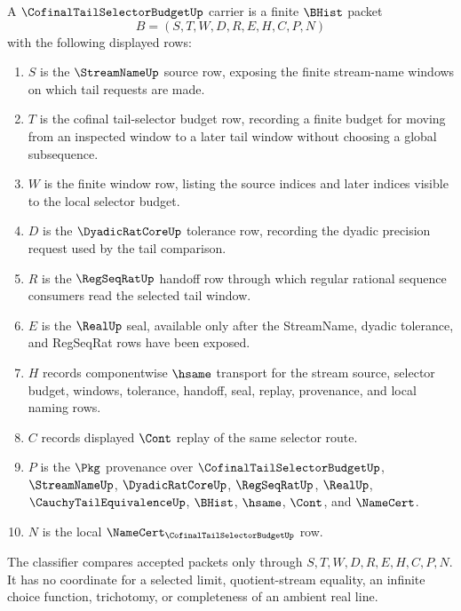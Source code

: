 \begin{definition}
\label{def:cofinal-tail-selector-budget-carrier}
A $\CofinalTailSelectorBudgetUp$ carrier is a finite $\BHist$ packet
$$
B=(S,T,W,D,R,E,H,C,P,N)
$$
with the following displayed rows:
\begin{enumerate}
\item $S$ is the $\StreamNameUp$ source row, exposing the finite stream-name windows on which tail requests are made.
\item $T$ is the cofinal tail-selector budget row, recording a finite budget for moving from an inspected window to a later tail window without choosing a global subsequence.
\item $W$ is the finite window row, listing the source indices and later indices visible to the local selector budget.
\item $D$ is the $\DyadicRatCoreUp$ tolerance row, recording the dyadic precision request used by the tail comparison.
\item $R$ is the $\RegSeqRatUp$ handoff row through which regular rational sequence consumers read the selected tail window.
\item $E$ is the $\RealUp$ seal, available only after the StreamName, dyadic tolerance, and RegSeqRat rows have been exposed.
\item $H$ records componentwise $\hsame$ transport for the stream source, selector budget, windows, tolerance, handoff, seal, replay, provenance, and local naming rows.
\item $C$ records displayed $\Cont$ replay of the same selector route.
\item $P$ is the $\Pkg$ provenance over $\CofinalTailSelectorBudgetUp$, $\StreamNameUp$, $\DyadicRatCoreUp$, $\RegSeqRatUp$, $\RealUp$, $\CauchyTailEquivalenceUp$, $\BHist$, $\hsame$, $\Cont$, and $\NameCert$.
\item $N$ is the local $\NameCert_{\CofinalTailSelectorBudgetUp}$ row.
\end{enumerate}
The classifier compares accepted packets only through $S,T,W,D,R,E,H,C,P,N$. It has no coordinate for a selected limit, quotient-stream equality, an infinite choice function, trichotomy, or completeness of an ambient real line.
\end{definition}

